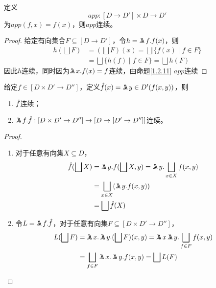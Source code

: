 \documentclass[11pt]{article}
\begin{document}
\begin{proposition}[]
\label{1.2.13}
定义
\begin{equation*}
app:[D\to D']\times D\to D'
\end{equation*}
为\(app(f,x)=f(x)\)，则\(app\)连续。
\end{proposition}

\begin{proof}
给定有向集合\(F\subseteq[D\to D']\)，令\(h=\metalambda f.f(x)\)，则
\begin{align*}
h(\bigsqcup F)&=(\bigsqcup F)(x)=\bigsqcup\{f(x)\mid f\in F\}\\
&=\bigsqcup\{h(f)\mid f\in F\}=\bigsqcup h(F)
\end{align*}
因此\(h\)连续，同时因为\(\metalambda x.f(x)=f\)连续，由命题\ref{1.2.11} \(app\)连续
\end{proof}

\begin{proposition}[]
\label{1.2.14}
给定\(f\in[D\times D'\to D'']\)，定义\(\hatf(x)=\metalambda y\in D'(f(x,y))\)，则
\begin{enumerate}
\item \(\hat{f}\)连续；
\item \(\metalambda f.\hatf:[D\times D'\to D'']\to[D\to[D'\to D'']]\)连续。
\end{enumerate}
\end{proposition}

\begin{proof}
\begin{enumerate}
\item 对于任意有向集\(X\subseteq D\)，
\begin{align*}
\hatf(\bigsqcup X)&=\metalambda y.f(\bigsqcup X,y)=\metalambda y.\bigsqcup_{x\in X}f(x,y)\\
&=\bigsqcup_{x\in X}(\metalambda y.f(x,y))\\
&=\bigsqcup\hatf(X)
\end{align*}
\item 令\(L=\metalambda f.\hatf\)，对于任意有向集\(F\subseteq[D\times D'\to D'']\)，
\begin{align*}
L(\bigsqcup F)&=\metalambda x.\metalambda y.(\bigsqcup F)(x,y)=\metalambda x\metalambda y.\bigsqcup_{f\in F}f(x,y)\\
&=\bigsqcup_{f\in F}\metalambda x.\metalambda y.f(x,y)=\bigsqcup L(F)
\end{align*}
\end{enumerate}
\end{proof}
\end{document}
